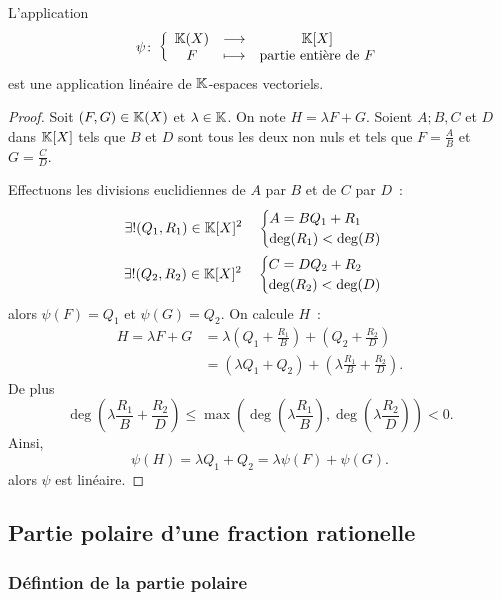 \begin{prop}
  L'application
  \begin{equation}
    \psi\colon \left\{\begin{array}{ccc} \mathbb{K}(X) & \longrightarrow &\mathbb{K}[X]\\ F & \longmapsto & \text{partie entière de } F \end{array} \right.
  \end{equation}
  est une application linéaire de $\mathbb{K}$-espaces vectoriels.
\end{prop}
\begin{proof}
  Soit $(F,G) \in \mathbb{K}(X)$ et $\lambda \in \mathbb{K}$. On note $H=\lambda F+G$. Soient $A;B,C$ et $D$ dans $\mathbb{K}[X]$ tels que $B$ et $D$ sont tous les deux non nuls et tels que $F=\frac{A}{B}$ et $G=\frac{C}{D}$.

  Effectuons les divisions euclidiennes de $A$ par $B$ et de $C$ par $D$~:
  \begin{align}
    \exists! (Q_1,R_1) \in \mathbb{K}[X]^2 \quad \begin{cases} A = BQ_1+R_1 \\ \deg(R_1) < \deg(B) \end{cases} \\ 
    \exists! (Q_2,R_2) \in \mathbb{K}[X]^2 \quad \begin{cases} C = DQ_2+R_2 \\ \deg(R_2) < \deg(D) \end{cases}
  \end{align}
  alors $\psi(F)=Q_1$ et $\psi(G)=Q_2$. On calcule $H$~:
  \begin{align}
    H = \lambda F+G &= \lambda\left(Q_1+\frac{R_1}{B}\right)+\left(Q_2+\frac{R_2}{D}\right) \\
    &=(\lambda Q_1 +Q_2) +\left(\lambda \frac{R_1}{B} +\frac{R_2}{D} \right).
  \end{align}
  De plus
  \begin{equation}
    \deg\left(\lambda \frac{R_1}{B} +\frac{R_2}{D} \right) \leqslant \max\left(\deg\left(\lambda \frac{R_1}{B}\right),\deg\left(\lambda \frac{R_2}{D}\right)\right) <0.
  \end{equation}
  Ainsi,
  \begin{equation}
    \psi(H)= \lambda Q_1+Q_2 = \lambda \psi(F)+\psi(G).
  \end{equation}
  alors $\psi$ est linéaire.
\end{proof}

\subsection{Partie polaire d'une fraction rationelle}

\subsubsection{Défintion de la partie polaire}

